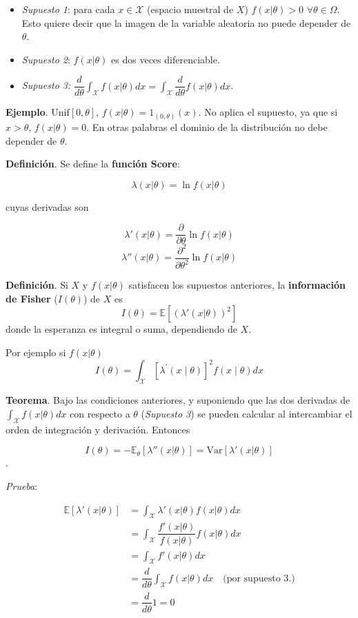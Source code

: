 \documentclass[
  12pt,
]{book}
\begin{document}
\begin{itemize}
\item
  \emph{Supuesto 1}: para cada \(x \in \mathcal X\) (espacio muestral de \(X\)) \(f(x|\theta)> 0\) \(\forall \theta \in \Omega\). Esto quiere decir que la imagen de la variable aleatoria no puede depender de \(\theta\).
\item
  \emph{Supuesto 2}: \(f(x|\theta)\) es dos veces diferenciable.
\item
  \emph{Supuesto 3:} \(\dfrac d{d\theta}\int_{\mathcal X}f(x|\theta)dx = \int_{\mathcal X}\dfrac d{d\theta}f(x|\theta)dx\).
\end{itemize}

\textbf{Ejemplo}. \(\text{Unif}[0,\theta]\), \(f(x|\theta) = 1_{(0,\theta)}(x)\). No
aplica el supuesto, ya que si \(x>\theta\), \(f(x|\theta) = 0\). En otras palabras
el dominio de la distribución no debe depender de \(\theta\).

\textbf{Definición}. Se define la \textbf{función Score}:

\[\lambda(x|\theta)=\ln f(x|\theta)\]

cuyas derivadas son

\[\lambda'(x|\theta) = \dfrac \partial{\partial \theta}\ln f(x|\theta)\]
\[\lambda''(x|\theta) = \dfrac {\partial^2}{\partial \theta^2}\ln f(x|\theta)\]

\textbf{Definición}. Si \(X\) y \(f(x|\theta)\) satisfacen los supuestos anteriores, la \textbf{información de Fisher} (\(I(\theta)\)) de \(X\) es
\[I(\theta) =\mathbb E[(\lambda'(x|\theta))^2]\]
donde la esperanza es integral o suma, dependiendo de \(X\).

Por ejemplo si \(f(x\vert\theta)\)
\begin{equation}
I(\theta)=\int_{\mathcal{X}}\left[\lambda^{\prime}(x \mid \theta)\right]^{2} f(x \mid \theta) d x
\end{equation}

\textbf{Teorema}. Bajo las condiciones anteriores, y suponiendo que las dos derivadas
de \(\int_{\mathcal X}f(x|\theta)dx\) con respecto a \(\theta\) (\emph{Supuesto 3}) se
pueden calcular al intercambiar el orden de integración y derivación. Entonces

\[I(\theta) = -\mathbb E_{\theta}[\lambda''(x|\theta)] = \text{Var}[\lambda'(x|\theta)]\].

\emph{Prueba}:

\begin{align*}
    \mathbb E[\lambda'(x|\theta)]
  & = \int_{\mathcal X}\lambda'(x|\theta)f(x|\theta)dx                                            \\
  & = \int_{\mathcal X} \dfrac{f'(x|\theta)}{f(x|\theta)}f(x|\theta)dx                            \\
  & =  \int_{\mathcal X}f'(x|\theta)dx                                                            \\
  & = \dfrac d{d\theta}\int_{\mathcal X}f(x|\theta)dx \quad \text{(por supuesto 3.)} \\
  & = \dfrac d{d\theta}1 = 0
\end{align*}
\end{document}
